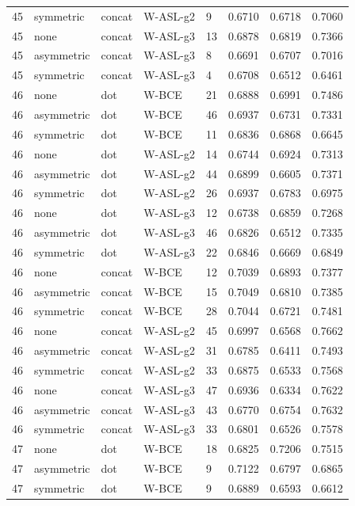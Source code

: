 \begin{longtable}{rllllrrr}
45 & symmetric & concat & W-ASL-g2 & 9 & 0.6710 & 0.6718 & 0.7060 \\
45 & none & concat & W-ASL-g3 & 13 & 0.6878 & 0.6819 & 0.7366 \\
45 & asymmetric & concat & W-ASL-g3 & 8 & 0.6691 & 0.6707 & 0.7016 \\
45 & symmetric & concat & W-ASL-g3 & 4 & 0.6708 & 0.6512 & 0.6461 \\
46 & none & dot & W-BCE & 21 & 0.6888 & 0.6991 & 0.7486 \\
46 & asymmetric & dot & W-BCE & 46 & 0.6937 & 0.6731 & 0.7331 \\
46 & symmetric & dot & W-BCE & 11 & 0.6836 & 0.6868 & 0.6645 \\
46 & none & dot & W-ASL-g2 & 14 & 0.6744 & 0.6924 & 0.7313 \\
46 & asymmetric & dot & W-ASL-g2 & 44 & 0.6899 & 0.6605 & 0.7371 \\
46 & symmetric & dot & W-ASL-g2 & 26 & 0.6937 & 0.6783 & 0.6975 \\
46 & none & dot & W-ASL-g3 & 12 & 0.6738 & 0.6859 & 0.7268 \\
46 & asymmetric & dot & W-ASL-g3 & 46 & 0.6826 & 0.6512 & 0.7335 \\
46 & symmetric & dot & W-ASL-g3 & 22 & 0.6846 & 0.6669 & 0.6849 \\
46 & none & concat & W-BCE & 12 & 0.7039 & 0.6893 & 0.7377 \\
46 & asymmetric & concat & W-BCE & 15 & 0.7049 & 0.6810 & 0.7385 \\
46 & symmetric & concat & W-BCE & 28 & 0.7044 & 0.6721 & 0.7481 \\
46 & none & concat & W-ASL-g2 & 45 & 0.6997 & 0.6568 & 0.7662 \\
46 & asymmetric & concat & W-ASL-g2 & 31 & 0.6785 & 0.6411 & 0.7493 \\
46 & symmetric & concat & W-ASL-g2 & 33 & 0.6875 & 0.6533 & 0.7568 \\
46 & none & concat & W-ASL-g3 & 47 & 0.6936 & 0.6334 & 0.7622 \\
46 & asymmetric & concat & W-ASL-g3 & 43 & 0.6770 & 0.6754 & 0.7632 \\
46 & symmetric & concat & W-ASL-g3 & 33 & 0.6801 & 0.6526 & 0.7578 \\
47 & none & dot & W-BCE & 18 & 0.6825 & 0.7206 & 0.7515 \\
47 & asymmetric & dot & W-BCE & 9 & 0.7122 & 0.6797 & 0.6865 \\
47 & symmetric & dot & W-BCE & 9 & 0.6889 & 0.6593 & 0.6612 \\

\end{longtable}
